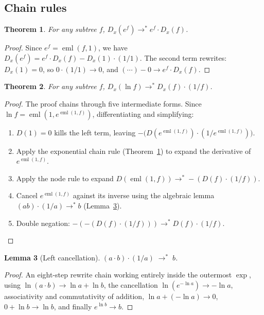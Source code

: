 \documentclass[11pt]{article}
\newtheorem{theorem}{Theorem}
\newtheorem{lemma}[theorem]{Lemma}
\begin{document}
\subsection{Chain rules}

\begin{theorem}\label{thm:chain-exp}
For any subtree $f$, \;$D_x(e^f) \to^{*} e^f \cdot D_x(f)$.
\end{theorem}

\begin{proof}
Since $e^f = \operatorname{eml}(f, 1)$, we have
$D_x(e^f) = e^f \cdot D_x(f) - D_x(1) \cdot (1/1)$.
The second term rewrites: $D_x(1) = 0$, so $0 \cdot (1/1) \to 0$,
and $(\cdots) - 0 \to e^f \cdot D_x(f)$.
\end{proof}

\begin{theorem}\label{thm:chain-ln}
For any subtree $f$, \;$D_x(\ln f) \to^{*} D_x(f) \cdot (1/f)$.
\end{theorem}

\begin{proof}
The proof chains through five intermediate forms.
Since $\ln f = \operatorname{eml}(1, e^{\operatorname{eml}(1,f)})$,
differentiating and simplifying:
\begin{enumerate}
\item $D(1) = 0$ kills the left term, leaving
  $-\bigl(D(e^{\operatorname{eml}(1,f)}) \cdot (1/e^{\operatorname{eml}(1,f)})\bigr)$.
\item Apply the exponential chain rule (Theorem~\ref{thm:chain-exp})
  to expand the derivative of $e^{\operatorname{eml}(1,f)}$.
\item Apply the node rule to expand
  $D(\operatorname{eml}(1,f)) \to^{*} -(D(f) \cdot (1/f))$.
\item Cancel $e^{\operatorname{eml}(1,f)}$ against its inverse using
  the algebraic lemma $(ab) \cdot (1/a) \to^{*} b$
  (Lemma~\ref{lem:cancel}).
\item Double negation: $-(-(D(f) \cdot (1/f))) \to^{*} D(f) \cdot (1/f)$.
\end{enumerate}
\end{proof}

\begin{lemma}[Left cancellation]\label{lem:cancel}
$(a \cdot b) \cdot (1/a) \;\to^{*}\; b$.
\end{lemma}

\begin{proof}
An eight-step rewrite chain working entirely inside the outermost
$\exp$, using $\ln(a \cdot b) \to \ln a + \ln b$, the cancellation
$\ln(e^{-\ln a}) \to -\ln a$, associativity and commutativity of
addition, $\ln a + (-\ln a) \to 0$, $0 + \ln b \to \ln b$, and
finally $e^{\ln b} \to b$.
\end{proof}
\end{document}
